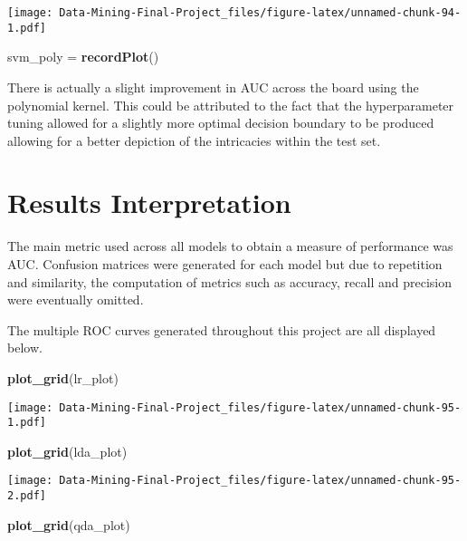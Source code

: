 \documentclass[
]{article}
\newenvironment{Shaded}{\begin{snugshade}}{\end{snugshade}}
\newcommand{\FunctionTok}[1]{\textcolor[rgb]{0.13,0.29,0.53}{\textbf{#1}}}
\newcommand{\NormalTok}[1]{#1}
\newcommand{\OtherTok}[1]{\textcolor[rgb]{0.56,0.35,0.01}{#1}}
\begin{document}
\texttt{[image: Data-Mining-Final-Project\_files/figure-latex/unnamed-chunk-94-1.pdf]}

\begin{Shaded}
\begin{Highlighting}[]
\NormalTok{svm\_poly }\OtherTok{=} \FunctionTok{recordPlot}\NormalTok{()}
\end{Highlighting}
\end{Shaded}

There is actually a slight improvement in AUC across the board using the
polynomial kernel. This could be attributed to the fact that the
hyperparameter tuning allowed for a slightly more optimal decision
boundary to be produced allowing for a better depiction of the
intricacies within the test set.

\section{Results Interpretation}\label{results-interpretation}

The main metric used across all models to obtain a measure of
performance was AUC. Confusion matrices were generated for each model
but due to repetition and similarity, the computation of metrics such as
accuracy, recall and precision were eventually omitted.

The multiple ROC curves generated throughout this project are all
displayed below.

\begin{Shaded}
\begin{Highlighting}[]
\FunctionTok{plot\_grid}\NormalTok{(lr\_plot)}
\end{Highlighting}
\end{Shaded}

\texttt{[image: Data-Mining-Final-Project\_files/figure-latex/unnamed-chunk-95-1.pdf]}

\begin{Shaded}
\begin{Highlighting}[]
\FunctionTok{plot\_grid}\NormalTok{(lda\_plot)}
\end{Highlighting}
\end{Shaded}

\texttt{[image: Data-Mining-Final-Project\_files/figure-latex/unnamed-chunk-95-2.pdf]}

\begin{Shaded}
\begin{Highlighting}[]
\FunctionTok{plot\_grid}\NormalTok{(qda\_plot)}
\end{Highlighting}
\end{Shaded}
\end{document}
